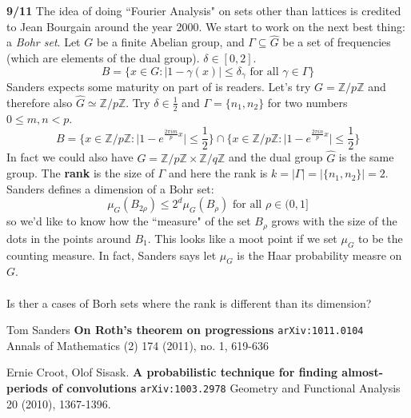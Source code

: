 \documentclass[12pt]{article}
\begin{document}
\noindent \textbf{9/11} The idea of doing ``Fourier Analysis" on sets other than lattices is credited to Jean Bourgain around the year 2000. We start to work on the next best thing: a \textit{Bohr set}.  Let $G$ be a finite Abelian group, and $\Gamma \subseteq \widehat{G}$ be a set of frequencies (which are elements of the dual group).  $\delta \in [0,2]$.
$$ B = \{ x \in G : | 1 - \gamma(x) | \leq \delta_\gamma \text{ for all } \gamma \in \Gamma \}  $$
Sanders expects some maturity on part of is readers.  Let's try $G = \mathbb{Z}/p\mathbb{Z}$ and therefore also $\widehat{G} \simeq \mathbb{Z}/p\mathbb{Z} $.  Try $\delta \in \frac{1}{2}$ and $\Gamma = \{ n_1, n_2 \}$ for two numbers $0 \leq m,n < p$. 
$$ B = \Big\{ x \in \mathbb{Z}/p\mathbb{Z} : \big| 1 - e^{ \frac{2\pi im}{ p} x } \big| \leq  \frac{1}{2}  \Big\} \cap \Big\{ x \in \mathbb{Z}/p\mathbb{Z} : \big| 1 - e^{ \frac{2\pi in}{ p} x } \big| \leq  \frac{1}{2}  \Big\}  $$
In fact we could also have $G = \mathbb{Z}/p\mathbb{Z} \times \mathbb{Z}/q\mathbb{Z}$ and the dual group $\widehat{G}$ is the same group.  The \textbf{rank} is the size of $\Gamma$  and here the rank is $k = |\Gamma| = |\{ n_1, n_2\}| = 2$.  Sanders defines a dimension of a Bohr set:
$$ \mu_G( B_{2\rho}) \leq 2^d \mu_G(B_\rho) \text{ for all } \rho \in (0,1] $$
so we'd like to know how the ``measure" of the set $B_\rho$ grows with the size of the dots in the points around $B_1$.  This looks like a moot point if we set $\mu_G$ to be the counting measure.  In fact, Sanders says let $\mu_G $ is the Haar probability measre on $G$.   \\ \\
Is ther a cases of Borh sets where the rank is different than its dimension?
\vfill
\begin{thebibliography}{}

\item Tom Sanders \textbf{On Roth's theorem on progressions} \texttt{arXiv:1011.0104} \\
Annals of Mathematics (2) 174 (2011), no. 1, 619-636

\item Ernie Croot, Olof Sisask. \textbf{A probabilistic technique for finding almost-periods of convolutions} \texttt{arXiv:1003.2978} Geometry and Functional Analysis 20 (2010), 1367-1396.

\end{thebibliography}
\end{document}
